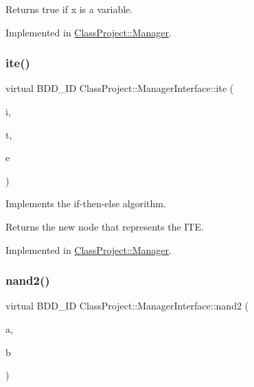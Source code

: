 \begin{DoxyReturn}{Returns}
true if x is a variable. 
\end{DoxyReturn}


Implemented in \hyperlink{classClassProject_1_1Manager_af026f76f68823bb9083f161b5db9e58b}{Class\+Project\+::\+Manager}.

\mbox{\label{classClassProject_1_1ManagerInterface_a6ea8f9482d86afb4128c52328d9ec11c}} 
\subsubsection{\texorpdfstring{ite()}{ite()}}
{\footnotesize\ttfamily virtual B\+D\+D\+\_\+\+ID Class\+Project\+::\+Manager\+Interface\+::ite (\begin{DoxyParamCaption}\item[{const B\+D\+D\+\_\+\+ID}]{i,  }\item[{const B\+D\+D\+\_\+\+ID}]{t,  }\item[{const B\+D\+D\+\_\+\+ID}]{e }\end{DoxyParamCaption})\hspace{0.3cm}{\ttfamily [pure virtual]}}

Implements the if-\/then-\/else algorithm. \begin{DoxyReturn}{Returns}
the new node that represents the I\+TE. 
\end{DoxyReturn}


Implemented in \hyperlink{classClassProject_1_1Manager_ab6b8135aadc0a5b91b5c651c4046da05}{Class\+Project\+::\+Manager}.

\mbox{\label{classClassProject_1_1ManagerInterface_aaf6e357d680613e449d3ea958c9abba1}} 
\subsubsection{\texorpdfstring{nand2()}{nand2()}}
{\footnotesize\ttfamily virtual B\+D\+D\+\_\+\+ID Class\+Project\+::\+Manager\+Interface\+::nand2 (\begin{DoxyParamCaption}\item[{const B\+D\+D\+\_\+\+ID}]{a,  }\item[{const B\+D\+D\+\_\+\+ID}]{b }\end{DoxyParamCaption})\hspace{0.3cm}{\ttfamily [pure virtual]}}

